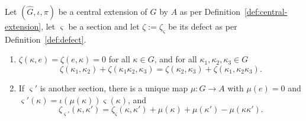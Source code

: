 \begin{proposition}\label{prop:defect-properties}
	Let $(\widehat{G},\iota,\pi)$ be a central extension of $G$ by $A$ as per Definition~\ref{def:central-extension}, let $\varsigma$ be a section and let $\zeta:=\zeta_\varsigma$ be its defect as per Definition~\ref{def:defect}.
	\begin{enumerate}
		\item $\zeta(\kappa,e)=\zeta(e,\kappa)=0$ for all $\kappa\in G$, and for all $\kappa_1,\kappa_2,\kappa_3\in G$
		\begin{equation}\label{eq:defect-associativity}
			\zeta(\kappa_1,\kappa_2)+\zeta(\kappa_1\kappa_2,\kappa_3)=\zeta(\kappa_2,\kappa_3)+\zeta(\kappa_1,\kappa_2\kappa_3).
		\end{equation}
		\item If $\varsigma'$ is another section, there is a unique map $\mu:G\to A$ with $\mu(e)=0$ and $\varsigma'(\kappa)=\iota(\mu(\kappa))\varsigma(\kappa)$, and
		\begin{equation}\label{eq:change-section}
			\zeta_{\varsigma'}(\kappa,\kappa')=\zeta_\varsigma(\kappa,\kappa')+\mu(\kappa)+\mu(\kappa')-\mu(\kappa\kappa').
		\end{equation}
	\end{enumerate}
\end{proposition}

